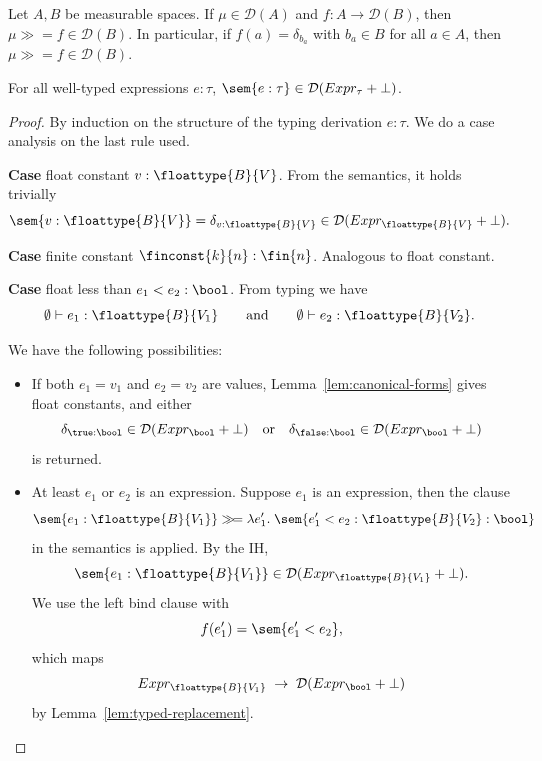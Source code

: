 \begin{proposition}\label{prop:bind-typing}
	Let $A,B$ be measurable spaces. If $\mu \in \mathcal{D}(A)$ and $f : A \to \mathcal{D}(B)$, then $\mu \gg\!= f \in \mathcal{D}(B)$. In particular, if $f(a) = \delta_{b_a}$ with $b_a \in B$ for all $a \in A$, then $\mu \gg\!= f \in \mathcal{D}(B)$.
\end{proposition}

	
\begin{lemma}\label{lem:well-defined}
	For all well-typed expressions $e : \tau$, $\sem{e : \tau} \in \mathcal{D}(Expr_{\tau} + \bot)$.
\end{lemma}

\begin{proof}
	By induction on the structure of the typing derivation $e : \tau$. We do a case analysis on the last rule used.

		\textbf{Case} float constant $v : \floattype{B}{V}$. From the semantics, it holds trivially
		\[
			\sem{v : \floattype{B}{V}} = \delta_{v : \floattype{B}{V}} \in \mathcal{D}(Expr_{\floattype{B}{V}} + \bot).
		\]

		\textbf{Case} finite constant $\finconst{k}{n} : \fin{n}$. Analogous to float constant.

		\textbf{Case} float less than $e_1 < e_2 : \bool$. 
		From typing we have 
		\[
		\emptyset \vdash e_1 : \floattype{B}{V_1} 
		\qquad\text{and}\qquad 
		\emptyset \vdash e_2 : \floattype{B}{V_2}.
		\]

		We have the following possibilities:
		\begin{itemize}
		\item If both $e_1 = v_1$ and $e_2 = v_2$ are values, Lemma~\ref{lem:canonical-forms} gives float constants, and either
		\[
			\delta_{\true:\bool} \in \mathcal{D}(Expr_{\bool} + \bot) 
			\quad\text{or}\quad
			\delta_{\false:\bool} \in \mathcal{D}(Expr_{\bool} + \bot)
		\]
		is returned.

		\item At least $e_1$ or $e_2$ is an expression. 
		Suppose $e_1$ is an expression, then the clause
		\[
			\sem{e_1 : \floattype{B}{V_1}} \gg\!= \lambda e_1'.\;
			\sem{e_1' < e_2 : \floattype{B}{V_2} : \bool}
		\]
		in the semantics is applied. By the IH,
		\[
			\sem{e_1 : \floattype{B}{V_1}} \in \mathcal{D}(Expr_{\floattype{B}{V_1}} + \bot).
		\]
		We use the left bind clause with 
		\[
			f(e_1') = \sem{e_1' < e_2},
		\]
		which maps
		\[
			Expr_{\floattype{B}{V_1}} \;\to\; \mathcal{D}(Expr_{\bool} + \bot)
		\]
		by Lemma~\ref{lem:typed-replacement}.


\end{itemize}
\end{proof}
